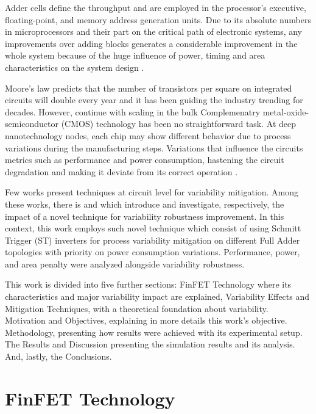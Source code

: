 \documentclass[ecp,tc, english]{iiufrgs}
\begin{document}
Adder cells define the throughput and are employed in the processor’s executive, floating-point, and memory address generation units. Due to its absolute numbers in microprocessors and their part on the critical path of electronic systems, any improvements over adding blocks generates a considerable improvement in the whole system because of the huge influence of power, timing and area characteristics on the system design \cite{shoarinejad:03}.

Moore’s law predicts that the number of transistors per square on integrated circuits will double every year and it has been guiding the industry trending for decades. However, continue with scaling in the bulk Complemenatry metal-oxide-semiconductor (CMOS) technology has been no straightforward task. At deep nanotechnology nodes, each chip may show different behavior due to process variations during the manufacturing steps. Variations that influence the circuits metrics such as performance and power consumption, hastening the circuit degradation and making it deviate from its correct operation \cite{abbas:15} \cite{nassif:08}. 

Few works present techniques at circuit level for variability mitigation. Among these works, there is \cite{dokania2015circuit} and \cite{samuel2016} which introduce and investigate, respectively, the impact of a novel technique for variability robustness improvement. In this context, this work employs such novel technique which consist of using Schmitt Trigger (ST) inverters for process variability mitigation on different Full Adder topologies with priority on power consumption variations. Performance, power, and area penalty were analyzed alongside variability robustness. 

This work is divided into five further sections: FinFET Technology where its characteristics and major variability impact are explained, Variability Effects and Mitigation Techniques, with a theoretical foundation about variability. Motivation and Objectives, explaining in more details this work’s objective. Methodology, presenting how results were achieved with its experimental setup. The Results and Discussion presenting the simulation results and its analysis. And, lastly, the Conclusions.

\chapter{FinFET Technology}
\end{document}
